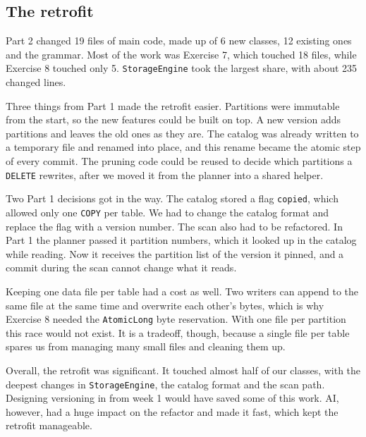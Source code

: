 \documentclass[11pt,a4paper,twocolumn]{article}
\begin{document}
\subsection{The retrofit}

Part 2 changed 19 files of main code, made up of 6 new classes, 12 existing ones and the grammar. Most of the work was Exercise 7, which touched 18 files, while Exercise 8 touched only 5. \texttt{StorageEngine} took the largest share, with about 235 changed lines.

Three things from Part 1 made the retrofit easier. Partitions were immutable from the start, so the new features could be built on top. A new version adds partitions and leaves the old ones as they are. The catalog was already written to a temporary file and renamed into place, and this rename became the atomic step of every commit. The pruning code could be reused to decide which partitions a \texttt{DELETE} rewrites, after we moved it from the planner into a shared helper.

Two Part 1 decisions got in the way. The catalog stored a flag \texttt{copied}, which allowed only one \texttt{COPY} per table. We had to change the catalog format and replace the flag with a version number. The scan also had to be refactored. In Part 1 the planner passed it partition numbers, which it looked up in the catalog while reading. Now it receives the partition list of the version it pinned, and a commit during the scan cannot change what it reads.

Keeping one data file per table had a cost as well. Two writers can append to the same file at the same time and overwrite each other's bytes, which is why Exercise 8 needed the \texttt{AtomicLong} byte reservation. With one file per partition this race would not exist. It is a tradeoff, though, because a single file per table spares us from managing many small files and cleaning them up.

Overall, the retrofit was significant. It touched almost half of our classes, with the deepest changes in \texttt{StorageEngine}, the catalog format and the scan path. Designing versioning in from week 1 would have saved some of this work. AI, however, had a huge impact on the refactor and made it fast, which kept the retrofit manageable.

\end{document}
